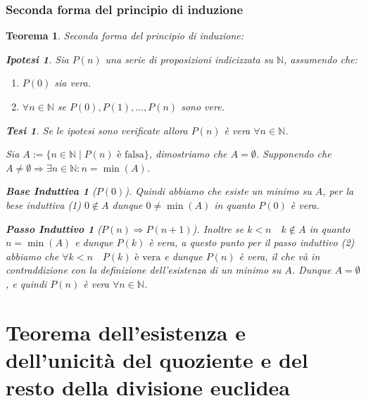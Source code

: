 \documentclass{article}
\makeatletter
\renewenvironment{proof}[1][\proofname]{\par
    \pushQED{\qed}%
    \normalfont \topsep6\p@\@plus6\p@\relax
    \trivlist
    \item\relax
    {\itshape
    #1\@addpunct{.}}\hspace\labelsep\ignorespaces
    }{%
    \popQED\endtrivlist\@endpefalse
}
\newtheorem{theorem}{Teorema}[part]
\newtheorem{ipothesis}[lemma]{Ipotesi}
\newtheorem{thesis}[lemma]{Tesi}
\theoremstyle{definition}
\newtheorem*{base}{Base Induttiva}
\newtheorem*{step}{Passo Induttivo}
\newcommand{\N}{\mathbb{N}}
\makeatother
\begin{document}
    \section{Seconda forma del principio di induzione}
        \begin{theorem}
            Seconda forma del principio di induzione:
            \begin{ipothesis}
                Sia \(P(n)\) una serie di proposizioni indicizzata su \(\mathbb{N}\), assumendo che:
                \begin{enumerate}
                    \item \(P(0)\) sia vera.
                    \item \(\forall n\in\mathbb{N}\) se \(P(0),P(1),\ldots,P(n)\) sono vere.
                \end{enumerate}
            \end{ipothesis}
            \begin{thesis}
                Se le ipotesi sono verificate allora \(P(n)\) è vera \(\forall n\in\N\).
            \end{thesis}
            \begin{proof}
                Sia \(A:=\{n\in\mathbb{N}\mid P(n)\text{ è falsa}\}\), dimostriamo che \(A=\emptyset\). Supponendo che \(A\neq\emptyset\Rightarrow \exists n\in\mathbb{N}: n=\min (A)\).
                \begin{base}[$P(0)$]
                    Quindi abbiamo che esiste un minimo su \(A\), per la bese induttiva (1) \(0\notin A\) dunque \(0\neq\min (A)\) in quanto \(P(0)\) è vera.
                \end{base}
                \begin{step}[$P(n)\Rightarrow P(n+1)$]
                    Inoltre se \(k<n\quad k\notin A\) in quanto \(n=\min(A)\) e dunque \(P(k)\) è vera, a questo punto per il passo induttivo (2) abbiamo che \(\forall k<n\quad P(k)\text{ è vera}\) e dunque \(P(n)\) è vera, il che và in contraddizione con la definizione dell'esistenza di un minimo su \(A\). Dunque \(A=\emptyset\), e quindi \(P(n)\) è vera \(\forall n\in\mathbb{N}\).
                \end{step}
            \pushQED{}
            \end{proof}
            \raggedleft{\ensuremath{\blacksquare}}
        \end{theorem}
\pagebreak
\part[Esistenza e unicità del quoziente e del resto nella divisione euclidea]{Teorema dell'esistenza e dell'unicità del quoziente e del resto della divisione euclidea}
\end{document}
